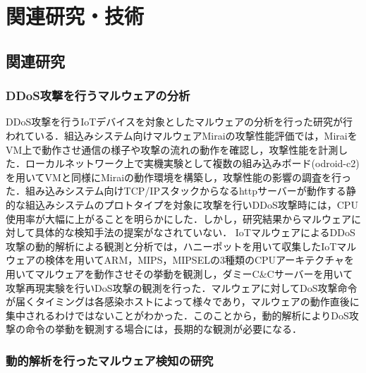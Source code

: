\chapter{関連研究・技術}
 
\section{関連研究}

\subsection{DDoS攻撃を行うマルウェアの分析}
DDoS攻撃を行うIoTデバイスを対象としたマルウェアの分析を行った研究が行われている．組込みシステム向けマルウェアMiraiの攻撃性能評価\cite{攻撃性能評価を行った研究}では，MiraiをVM上で動作させ通信の様子や攻撃の流れの動作を確認し，攻撃性能を計測した．ローカルネットワーク上で実機実験として複数の組み込みボード(odroid-c2)を用いてVMと同様にMiraiの動作環境を構築し，攻撃性能の影響の調査を行った．組み込みシステム向けTCP/IPスタックからなるhttpサーバーが動作する静的な組込みシステムのプロトタイプを対象に攻撃を行いDDoS攻撃時には，CPU使用率が大幅に上がることを明らかにした．しかし，研究結果からマルウェアに対して具体的な検知手法の提案がなされていない．
IoTマルウェアによるDDoS攻撃の動的解析による観測と分析\cite{観測と分析}では，ハニーポットを用いて収集したIoTマルウェアの検体を用いてARM，MIPS，MIPSELの3種類のCPUアーキテクチャを用いてマルウェアを動作させその挙動を観測し，ダミーC\&Cサーバーを用いて攻撃再現実験を行いDoS攻撃の観測を行った．マルウェアに対してDoS攻撃命令が届くタイミングは各感染ホストによって様々であり，マルウェアの動作直後に集中されるわけではないことがわかった．このことから，動的解析によりDoS攻撃の命令の挙動を観測する場合には，長期的な観測が必要になる．

\subsection{動的解析を行ったマルウェア検知の研究} %

